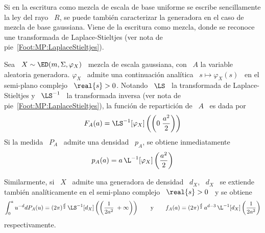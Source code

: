 Si  en  la  escritura  como  mezcla  de  escala  de  base  uniforme  se  escribe
sencillamente  la  ley  del rayo  \  $R$,  se  puede tambi\'en  caracterizar  la
generadora en  el caso de mezcla de  base gaussiana. Viene de  la escritura como
mezcla, donde  se reconoce  une transformada de  Laplace-Stieltjes (ver  nota de
pie~\ref{Foot:MP:LaplaceStieltjes}).

\begin{lema}\label{Lem:MP:PaLaplaceInversa}
  Sea \ $X \sim \ED(m,\Sigma,\varphi_X)$ \ mezcla de escala gaussiana, con \ $A$
  la  variable aleatoria  generadora.  $\varphi_X$  \ admite  una continuaci\'on
  anal\'itica \ $s \mapsto \varphi_X(s)$ \ en el semi-plano complejo \ $\real{s}
  > 0$.  Notando \ $\LS$ \ la transformada de Laplace-Stieltjes y \ $\LS^{-1}$ \
  la transformada  inversa (ver nota  de pie~\ref{Foot:MP:LaplaceStieltjes}), la
  funci\'on de repartici\'on de \ $A$ \ es dada por
  \[
  F_A(a) = \LS^{-1}[\varphi_X] \left( \left( 0 \; \frac{a^2}{2} \right) \right)
  \]
  Si la medida \ $P_A$ \ admite una densidad \ $p_A$, se obtiene inmediatamente
  \[
  p_A(a) = a \, \L^{-1}[\varphi_X] \left(\frac{a^2}{2} \right)
  \]

  Similarmente, si \ $X$ \ admite una  generadora de densidad \ $d_X$, \ $d_X$ \
  se extiende tambi\'en anal\'iticamente en el semi-plano complejo \ $\real{s} >
  0$ \ y se obtiene
  \[
  \int_0^a u^{-d} dP_A(u) = (2 \pi)^{\frac{d}{2}} \, \LS^{-1}[d_X] \left( \left(
      \frac{1}{2 a^2} \; +\infty \right) \right) \qquad \mbox{y} \qquad f_A(a) =
  (2 \pi)^{\frac{d}{2}} \, a^{d-3} \, \L^{-1}[d_X]\left( \frac{1}{2 a^2} \right)
  \]
  respectivamente.
\end{lema}
%
